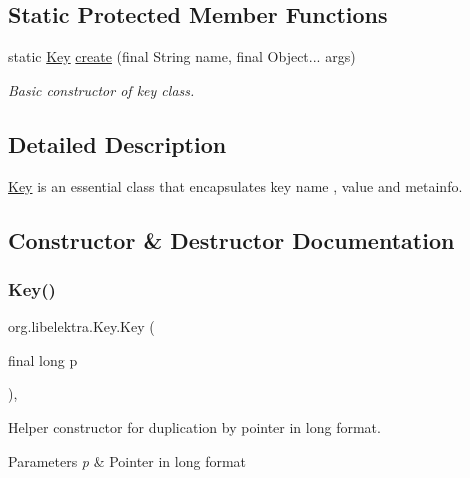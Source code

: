 \subsection*{Static Protected Member Functions}
\begin{DoxyCompactItemize}
\item 
static \mbox{\hyperlink{classorg_1_1libelektra_1_1Key}{Key}} \mbox{\hyperlink{classorg_1_1libelektra_1_1Key_af407cf43625618af4e7fb2576037fcfc}{create}} (final String name, final Object... args)
\begin{DoxyCompactList}\small\item\em Basic constructor of key class. \end{DoxyCompactList}\end{DoxyCompactItemize}


\subsection{Detailed Description}
\mbox{\hyperlink{classorg_1_1libelektra_1_1Key}{Key}} is an essential class that encapsulates key name , value and metainfo. 

\subsection{Constructor \& Destructor Documentation}
\mbox{\label{classorg_1_1libelektra_1_1Key_aeae5ed8b5eb0e9e4b7fce9ef9817fdfa}} 
\subsubsection{\texorpdfstring{Key()}{Key()}\hspace{0.1cm}{\footnotesize\ttfamily [1/2]}}
{\footnotesize\ttfamily org.\+libelektra.\+Key.\+Key (\begin{DoxyParamCaption}\item[{final long}]{p }\end{DoxyParamCaption})\hspace{0.3cm}{\ttfamily [inline]}, {\ttfamily [protected]}}



Helper constructor for duplication by pointer in long format. 


\begin{DoxyParams}{Parameters}
{\em p} & Pointer in long format \\
\hline
\end{DoxyParams}
\mbox{\label{classorg_1_1libelektra_1_1Key_af40497ff85d172136ed1f274a50d37e7}} 
